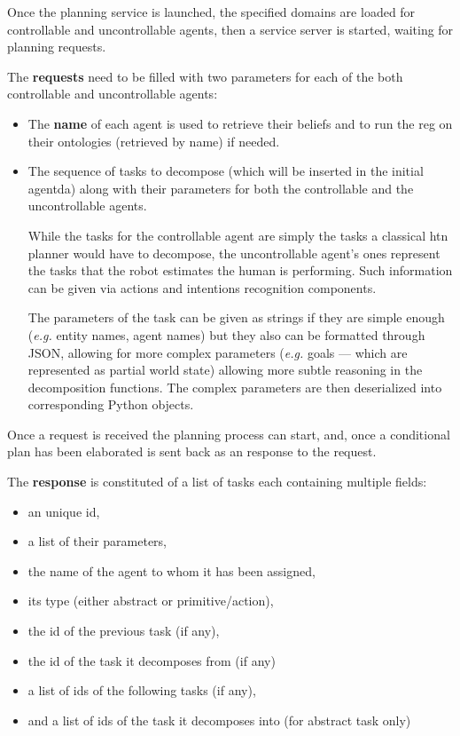 \documentclass[a4paper,11pt,twoside]{StyleThese}
\begin{document}
Once the planning service is launched, the specified domains are loaded for controllable and uncontrollable agents, then a service server is started, waiting for planning requests. 

The \textbf{requests} need to be filled with two parameters for each of the both controllable and uncontrollable agents:
\begin{itemize}
\item The \textbf{name} of each agent is used to retrieve their beliefs and to run the \acrshort{reg} on their ontologies (retrieved by name) if needed.

\item The sequence of tasks to decompose (which will be inserted in the initial agentda) along with their parameters for both the controllable and the uncontrollable agents. 

While the tasks for the controllable agent are simply the tasks a classical \acrshort{htn} planner would have to decompose, the uncontrollable agent's ones represent the tasks that the robot estimates the human is performing. Such information can be given via actions and intentions recognition components. 

The parameters of the task can be given as strings if they are simple enough (\textit{e.g.} entity names, agent names) but they also can be formatted through JSON, allowing for more complex parameters (\textit{e.g.} goals --- which are represented as partial world state) allowing more subtle reasoning in the decomposition functions. The complex parameters are then deserialized into corresponding Python objects.
\end{itemize}

Once a request is received the planning process can start, and, once a conditional plan has been elaborated is sent back as an response to the request. 

The \textbf{response} is constituted of a list of tasks each containing multiple fields: 
\begin{itemize}
\item an unique id,

\item a list of their parameters,

\item the name of the agent to whom it has been assigned,

\item its type (either abstract or primitive/action),

\item the id of the previous task (if any),

\item the id of the task it decomposes from (if any)

\item a list of ids of the following tasks (if any),

\item and a list of ids of the task it decomposes into (for abstract task only)
\end{itemize}
\end{document}
